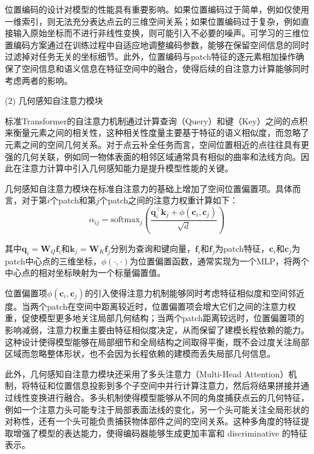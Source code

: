 位置编码的设计对模型的性能具有重要影响。如果位置编码过于简单，例如仅使用一维索引，则无法充分表达点云的三维空间关系；如果位置编码过于复杂，例如直接输入原始坐标而不进行非线性变换，则可能引入不必要的噪声。可学习的三维位置编码方案通过在训练过程中自适应地调整编码参数，能够在保留空间信息的同时过滤掉对任务无关的坐标细节。此外，位置编码与patch特征的逐元素相加操作确保了空间信息和语义信息在特征空间中的融合，使得后续的自注意力计算能够同时考虑两者的影响。

(2) 几何感知自注意力模块

标准Transformer的自注意力机制通过计算查询（Query）和键（Key）之间的点积来衡量元素之间的相关性，这种相关性度量主要基于特征的语义相似度，而忽略了元素之间的空间几何关系。对于点云补全任务而言，空间位置相近的点往往具有更强的几何关联，例如同一物体表面的相邻区域通常具有相似的曲率和法线方向。因此在注意力计算中引入几何感知能力是提升模型性能的关键。

几何感知自注意力模块在标准自注意力的基础上增加了空间位置偏置项。具体而言，对于第$i$个patch和第$j$个patch之间的注意力权重计算如下：
\begin{equation}
\alpha_{ij} = \text{softmax}_j\left(\frac{\mathbf{q}_i^\top \mathbf{k}_j + \phi(\mathbf{c}_i, \mathbf{c}_j)}{\sqrt{d}}\right)
\end{equation}

其中$\mathbf{q}_i = \mathbf{W}_Q \mathbf{f}_i$和$\mathbf{k}_j = \mathbf{W}_K \mathbf{f}_j$分别为查询和键向量，$\mathbf{f}_i$和$\mathbf{f}_j$为patch特征，$\mathbf{c}_i$和$\mathbf{c}_j$为patch中心点的三维坐标，$\phi(\cdot, \cdot)$为位置偏置函数，通常实现为一个MLP，将两个中心点的相对坐标映射为一个标量偏置值。

位置偏置项$\phi(\mathbf{c}_i, \mathbf{c}_j)$的引入使得注意力机制能够同时考虑特征相似度和空间邻近度。当两个patch在空间中距离较近时，位置偏置项会增大它们之间的注意力权重，促使模型更多地关注局部几何结构；当两个patch距离较远时，位置偏置项的影响减弱，注意力权重主要由特征相似度决定，从而保留了建模长程依赖的能力。这种设计使得模型能够在局部细节和全局结构之间取得平衡，既不会过度关注局部区域而忽略整体形状，也不会因为长程依赖的建模而丢失局部几何信息。

此外，几何感知自注意力模块还采用了多头注意力（Multi-Head Attention）机制，将特征和位置信息投影到多个子空间中并行计算注意力，然后将结果拼接并通过线性变换进行融合。多头机制使得模型能够从不同的角度捕获点云的几何特征，例如一个注意力头可能专注于局部表面法线的变化，另一个头可能关注全局形状的对称性，还有一个头可能负责捕获物体部件之间的空间关系。这种多角度的特征提取增强了模型的表达能力，使得编码器能够生成更加丰富和 discriminative 的特征表示。

